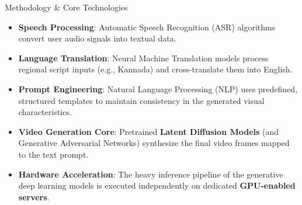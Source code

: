 \documentclass[aspectratio=169]{beamer}
\begin{document}
\begin{frame}{Methodology \& Core Technologies}
    \begin{itemize}
        \item \textbf{Speech Processing}: Automatic Speech Recognition (ASR) algorithms convert user audio signals into textual data.
        \item \textbf{Language Translation}: Neural Machine Translation models process regional script inputs (e.g., Kannada) and cross-translate them into English.
        \item \textbf{Prompt Engineering}: Natural Language Processing (NLP) uses predefined, structured templates to maintain consistency in the generated visual characteristics.
        \item \textbf{Video Generation Core}: Pretrained \textbf{Latent Diffusion Models} (and Generative Adversarial Networks) synthesize the final video frames mapped to the text prompt.
        \item \textbf{Hardware Acceleration}: The heavy inference pipeline of the generative deep learning models is executed independently on dedicated \textbf{GPU-enabled servers}.
    \end{itemize}
\end{frame}
\end{document}
